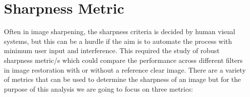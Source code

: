\graphicspath{{mehul_pics/}}%

\section{Sharpness Metric}
Often in image sharpening, the sharpness criteria is decided by human visual systems, but this can be a hurdle if the aim is to automate the process with minimum user input and interference. This required the study of robust sharpness metric/s which could compare the performance across different filters in image restoration with or without a reference clear image. There are a variety of metrics that can be used to determine the sharpness of an image but for the purpose of this analysis we are going to focus on three metrics:

